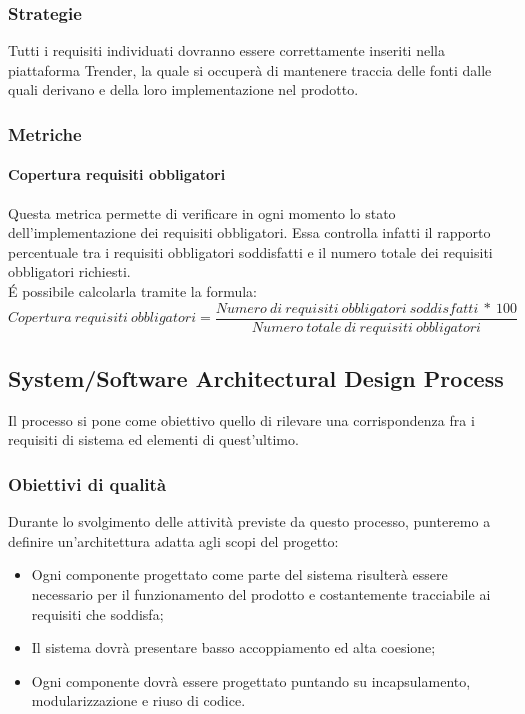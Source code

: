 \documentclass[../PianoDiQualifica.tex]{subfiles}
\begin{document}
			\subsubsection{Strategie}
			Tutti i requisiti individuati dovranno essere correttamente inseriti nella piattaforma Trender, la quale si occuperà di mantenere traccia delle fonti dalle quali derivano e della loro implementazione nel prodotto.
			
			\subsubsection{Metriche}
			\paragraph{Copertura requisiti obbligatori}
			Questa metrica permette di verificare in ogni momento lo stato dell'implementazione dei requisiti obbligatori. Essa controlla infatti il rapporto percentuale tra i requisiti obbligatori soddisfatti e il numero totale dei requisiti obbligatori richiesti.\\
				É possibile calcolarla tramite la formula:
				\begin{equation*}
					Copertura \ requisiti \ obbligatori = \frac{Numero \ di \ requisiti \ obbligatori \ soddisfatti \ * \ 100}{Numero \ totale \ di \ requisiti \ obbligatori}
				\end{equation*}

		\subsection{System/Software Architectural Design Process}
		Il processo si pone come obiettivo quello di rilevare una corrispondenza fra i requisiti di sistema ed elementi di quest'ultimo.
		
			\subsubsection{Obiettivi di qualità}
			Durante lo svolgimento delle attività previste da questo processo, punteremo a definire un'architettura adatta agli scopi del progetto:
			\begin{itemize}
				\item Ogni componente progettato come parte del sistema risulterà essere necessario per il funzionamento del prodotto e costantemente tracciabile ai requisiti che soddisfa;
				\item Il sistema dovrà presentare basso accoppiamento ed alta coesione;
				\item Ogni componente dovrà essere progettato puntando su incapsulamento, modularizzazione e riuso di codice.
			\end{itemize}
			
\end{document}
